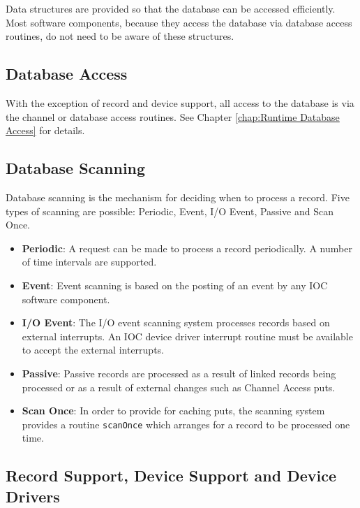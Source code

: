Data structures are provided so that the database can be accessed efficiently. Most software components, because they access the database via database access routines, do not need to be aware of these structures.

\subsection{Database Access}

With the exception of record and device support, all access to the database is via the channel or database access routines.
See Chapter \ref{chap:Runtime Database Access} for details.

\subsection{Database Scanning}

Database scanning is the mechanism for deciding when to process a record.
Five types of scanning are possible: Periodic, Event, I/O Event, Passive and Scan Once.

\begin{itemize}
\item \textbf{Periodic}:
A request can be made to process a record periodically.
A number of time intervals are supported.

\item \textbf{Event}:
Event scanning is based on the posting of an event by any IOC software component.

\item \textbf{I/O Event}:
The I/O event scanning system processes records based on external interrupts.
An IOC device driver interrupt routine must be available to accept the external interrupts.

\item \textbf{Passive}:
Passive records are processed as a result of linked records being processed or as a result of external changes such as Channel Access puts.

\item \textbf{Scan Once}:
In order to provide for caching puts, the scanning system provides a routine \verb|scanOnce| which arranges for a record to be processed one time.
\end{itemize}

\subsection{Record Support, Device Support and Device Drivers}

